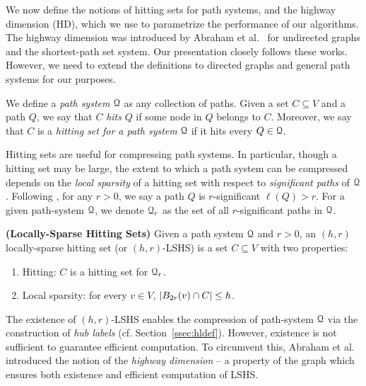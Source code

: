 
We now define the notions of hitting sets for path systems, and the highway dimension (HD), which we use to parametrize the performance of our algorithms. The highway dimension was introduced by Abraham et al.~\cite{highway2010,highway2013} for undirected graphs and the shortest-path set system. 
Our presentation closely follows these works.
However, we need to extend the definitions to directed graphs and general path systems for our purposes. 

We define a \emph{path system} $\calQ$ as any collection of paths.
Given a set $C\subseteq V$ and a path $Q$, we say that $C$ \emph{hits} $Q$ if some node in $Q$ belongs to $C$. Moreover, we say that $C$ is a \emph{hitting set for a path system} $\calQ$ if it hits every $Q\in\calQ$.

Hitting sets are useful for compressing path systems. In particular, though a hitting set may be large, the extent to which a path system can be compressed depends on the \emph{local sparsity} of a hitting set with respect to \emph{significant paths} of $\calQ$. 
Following \cite{highway2013}, for any $r>0$, we say a path $Q$ is $r$-significant $\ell(Q)>r$. For a given path-system $\calQ$, we denote $\calQ_r$ as the set of all $r$-significant paths in $\calQ$.
\begin{definition}
\label{def:lshs}
\textbf{(Locally-Sparse Hitting Sets)} Given a path system $\calQ$ and $r>0$, an $(h,r)$ locally-sparse hitting set (or $(h,r)$-LSHS) is a set $C\subseteq V$ with two properties: 
\begin{enumerate}[nosep]
\item Hitting: $C$ is a hitting set for $\calQ_r$.
\item Local sparsity: for every $v\in V$, $\abs*{B_{2r}(v)\cap C}\leq h$.
\end{enumerate}
\end{definition}


The existence of $(h,r)$-LSHS enables the compression of path-system $\calQ$ via the construction of \emph{hub labels} (cf. Section~\ref{ssec:hldef}). However, existence is not sufficient to guarantee efficient computation. 
To circumvent this, Abraham et al.~\cite{highway2013} introduced the notion of the \emph{highway dimension} -- a property of the graph which ensures both existence and efficient computation of LSHS. 

